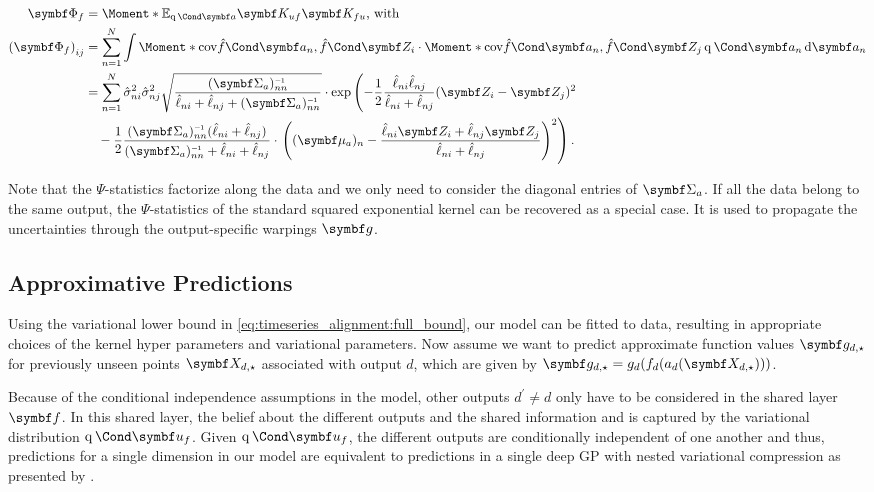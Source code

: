 \begin{align}
\begin{split}
    \mat{\Phi_f} &= \Moment*{\E_{\Variat{\rv{a}}}}{\mat{K_{uf}}\mat{K_{fu}}}\text{, with} \\
    \left(\mat{\Phi_f} \right)_{ij} &= \sum_{n=1}^N \int \Moment*{\cov}{\Fun{\hat{f}}{\mat{a_n}}, \Fun{\hat{f}}{\mat{Z_i}}}
    \cdot \Moment*{\cov}{\Fun{\hat{f}}{\mat{a_n}}, \Fun{\hat{f}}{\mat{Z_j}}} \Variat{\rv{a_n}} \diff \rv{a_n} \\
    &= \sum_{n=1}^N \hat{\sigma}_{ni}^2 \hat{\sigma}_{nj}^2 \sqrt{\frac{(\mat{\Sigma_a})_{nn}\inv}{\hat{\ell}_{ni} + \hat{\ell}_{nj} + (\mat{\Sigma_a})_{nn}\inv}}
    \cdot \exp\left( -\frac{1}{2} \frac{\hat{\ell}_{ni}\hat{\ell}_{nj}}{\hat{\ell}_{ni} + \hat{\ell}_{nj}} (\mat{Z_i} - \mat{Z_j})^2 \right. \\
    &\quad {} - \frac{1}{2} \frac{(\mat{\Sigma_a})_{nn}\inv(\hat{\ell}_{ni} + \hat{\ell}_{nj})}{(\mat{\Sigma_a})_{nn}\inv + \hat{\ell}_{ni} + \hat{\ell}_{nj}}
    \cdot \left.\left( (\mat{\mu_a})_n - \frac{\hat{\ell}_{ni} \mat{Z_i} + \hat{\ell}_{nj} \mat{Z_j}}{\hat{\ell}_{ni} + \hat{\ell}_{nj}} \right)^2 \right).
\end{split}
\end{align}

Note that the $\Psi$-statistics factorize along the data and we only need to consider the diagonal entries of $\mat{\Sigma_a}$.
If all the data belong to the same output, the $\Psi$-statistics of the standard squared exponential kernel can be recovered as a special case.
It is used to propagate the uncertainties through the output-specific warpings $\rv{g}$.


\subsection{Approximative Predictions}
\label{sub:timeseries_alignment:predictions}
Using the variational lower bound in \cref{eq:timeseries_alignment:full_bound}, our model can be fitted to data, resulting in appropriate choices of the kernel hyper parameters and variational parameters.
Now assume we want to predict approximate function values $\mat{g_{d, \star}}$ for previously unseen points $\mat{X_{d, \star}}$ associated with output $d$, which are given by $ \mat{g_{d, \star}} = g_d(f_d(a_d(\mat{X_{d, \star}})))$.

Because of the conditional independence assumptions in the model, other outputs $d^\prime \neq d$ only have to be considered in the shared layer $\rv{f}$.
In this shared layer, the belief about the different outputs and the shared information and is captured by the variational distribution $\Variat{\rv{u_f}}$.
Given $\Variat{\rv{u_f}}$, the different outputs are conditionally independent of one another and thus, predictions for a single dimension in our model are equivalent to predictions in a single deep GP with nested variational compression as presented by \textcite{hensman_nested_2014}.

